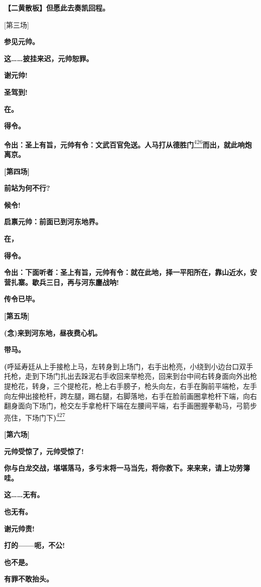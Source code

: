 \textbf{【二黄散板】但愿此去奏凯回程。}

{[}第三场{]}

\textbf{参见元帅。}

\textbf{这\ldots{}\ldots{}披挂来迟，元帅恕罪。}

\textbf{谢元帅!}

\textbf{圣驾到!}

\textbf{在。}

\textbf{得令。}

\textbf{令出：圣上有旨，元帅有令：文武百官免送。人马打从德胜门}\protect\hyperlink{fn426}{\textsuperscript{426}}\textbf{而出，就此响炮离京。}

\textbf{{[}第四场{]}}

\textbf{前站为何不行?}

\textbf{候令!}

\textbf{启禀元帅：前面已到河东地界。}

\textbf{在，}

\textbf{得令。}

\textbf{令出：下面听者：圣上有旨，元帅有令：就在此地，择一平阳所在，靠山近水，安营扎寨。歇兵三日，再与河东鏖战呐!}

\textbf{传令已毕。}

\textbf{{[}第五场{]}}

\textbf{(念)来到河东地，昼夜费心机。}

\textbf{带马。}

\textbf{(}呼延寿廷从上手接枪上马，左转身到上场门，右手出枪亮，小绕到小边台口双手托枪，走到下场门扎出去跺泥右手收回来举枪亮，回来到台中间右转身面向外出枪提枪花，转身，三个提枪花，枪上右手膀子，枪头向左，右手在胸前平端枪，左手向左伸出接枪杆，跨左腿，踢右腿，右脚落地，右手在脸前画圈拿枪杆下端，向右翻身面向下场门，枪交左手拿枪杆下端在左腰间平端，右手画圈握拳勒马，弓箭步亮住，下场门下\textbf{)}\protect\hyperlink{fn427}{\textsuperscript{427}}

\textbf{{[}第六场{]}}

\textbf{元帅受惊了，元帅受惊了!}

\textbf{你与白龙交战，堪堪落马，多亏末将一马当先，将你救下。来来来，请上功劳簿哇。}

\textbf{这\ldots{}\ldots{}无有。}

\textbf{也无有。}

\textbf{谢元帅责!}

\textbf{打的------呃，不公!}

\textbf{也不是。}

\textbf{有罪不敢抬头。}

